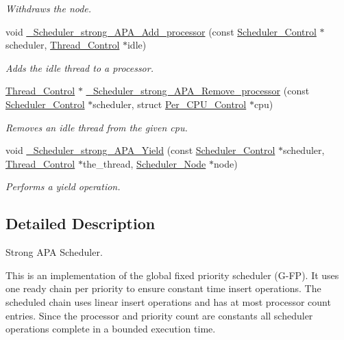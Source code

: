 \begin{DoxyCompactItemize}
\begin{DoxyCompactList}\small\item\em Withdraws the node. \end{DoxyCompactList}\item 
void \mbox{\hyperlink{group__RTEMSScoreSchedulerStrongAPA_ga6ac09dac24785561fd7c5ee5bbd8f5ca}{\+\_\+\+Scheduler\+\_\+strong\+\_\+\+A\+P\+A\+\_\+\+Add\+\_\+processor}} (const \mbox{\hyperlink{struct__Scheduler__Control}{Scheduler\+\_\+\+Control}} $\ast$scheduler, \mbox{\hyperlink{struct__Thread__Control}{Thread\+\_\+\+Control}} $\ast$idle)
\begin{DoxyCompactList}\small\item\em Adds the idle thread to a processor. \end{DoxyCompactList}\item 
\mbox{\hyperlink{struct__Thread__Control}{Thread\+\_\+\+Control}} $\ast$ \mbox{\hyperlink{group__RTEMSScoreSchedulerStrongAPA_gac83f4ab63b404cdfea31e572fa9590a5}{\+\_\+\+Scheduler\+\_\+strong\+\_\+\+A\+P\+A\+\_\+\+Remove\+\_\+processor}} (const \mbox{\hyperlink{struct__Scheduler__Control}{Scheduler\+\_\+\+Control}} $\ast$scheduler, struct \mbox{\hyperlink{structPer__CPU__Control}{Per\+\_\+\+C\+P\+U\+\_\+\+Control}} $\ast$cpu)
\begin{DoxyCompactList}\small\item\em Removes an idle thread from the given cpu. \end{DoxyCompactList}\item 
void \mbox{\hyperlink{group__RTEMSScoreSchedulerStrongAPA_ga0720c2d79f2b6dd8e91d19879f72b8c7}{\+\_\+\+Scheduler\+\_\+strong\+\_\+\+A\+P\+A\+\_\+\+Yield}} (const \mbox{\hyperlink{struct__Scheduler__Control}{Scheduler\+\_\+\+Control}} $\ast$scheduler, \mbox{\hyperlink{struct__Thread__Control}{Thread\+\_\+\+Control}} $\ast$the\+\_\+thread, \mbox{\hyperlink{structScheduler__Node}{Scheduler\+\_\+\+Node}} $\ast$node)
\begin{DoxyCompactList}\small\item\em Performs a yield operation. \end{DoxyCompactList}\end{DoxyCompactItemize}


\subsection{Detailed Description}
Strong A\+PA Scheduler. 

This is an implementation of the global fixed priority scheduler (G-\/\+FP). It uses one ready chain per priority to ensure constant time insert operations. The scheduled chain uses linear insert operations and has at most processor count entries. Since the processor and priority count are constants all scheduler operations complete in a bounded execution time.

